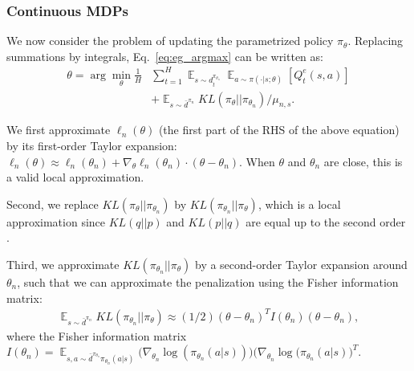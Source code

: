 \documentclass{article}
\begin{document}

\subsubsection{Continuous MDPs}
We now consider the problem of updating the parametrized policy $\pi_{\theta}$. Replacing summations by integrals, Eq.~\ref{eq:eg_argmax} can be written as:
\begin{align}
\label{eq:continuous_eg}
\theta = \arg\min_{\theta}\frac{1}{H}& \sum_{t=1}^H  \mathop{\mathbb{E}}_{s\sim d_t^{\pi_{\theta_n}}}\mathop{\mathbb{E}}_{a\sim\pi(\cdot|s;\theta)}[Q_t^e(s,a)] \nonumber\\
& + \mathop{\mathbb{E}}_{s\sim\bar{d}^{\pi_n}}KL(\pi_{\theta} ||\pi_{\theta_n})/\mu_{n,s}.
\end{align} 

We first approximate $\ell_n(\theta)$ (the first part of the RHS of the above equation) by its first-order Taylor expansion: $\ell_n(\theta)\approx \ell_n(\theta_n) + \nabla_{\theta}\ell_n(\theta_n) \cdot (\theta - \theta_n)$. When $\theta$ and $\theta_n$ are close, this is a valid local approximation. 

Second, we replace $KL(\pi_{\theta}||\pi_{\theta_n})$ by $KL(\pi_{\theta_n}||\pi_{\theta})$, which is a local approximation since $KL(q||p)$ and $KL(p||q)$ are equal up to the second order \cite{kakade2002approximately,schulman2015trust}.

Third, we approximate $KL(\pi_{\theta_n}||\pi_{\theta})$ by a second-order Taylor expansion around $\theta_n$, such that we can approximate the penalization using the Fisher information matrix:
\begin{align}
\mathop{\mathbb{E}}_{s\sim\bar{d}^{\pi_n}}KL(\pi_{\theta_n} || \pi_{\theta}) \approx (1/2)(\theta - \theta_n)^T I(\theta_n)(\theta-\theta_n), \nonumber
\end{align} where the Fisher information matrix $I(\theta_n)=\mathop{\mathbb{E}}_{s,a\sim \bar{d}^{\pi_{\theta_n}}\pi_{\theta_n}(a|s)}\big(\nabla_{\theta_n}\log(\pi_{\theta_n}(a|s))\big)\big(\nabla_{\theta_n}\log(\pi_{\theta_n}(a|s)\big)^T$. 
\end{document}
